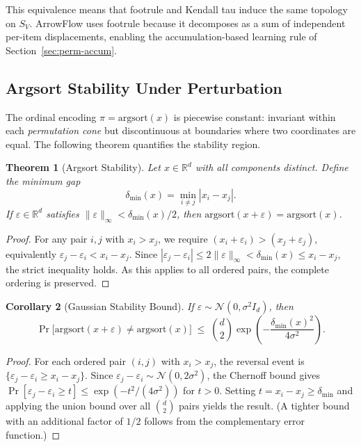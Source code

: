 \documentclass[12pt]{article}
\newcommand{\R}{\mathbb{R}}
\newcommand{\argsort}{\mathrm{argsort}}
\newtheorem{theorem}{Theorem}
\newtheorem{corollary}[theorem]{Corollary}
\begin{document}
This equivalence means that footrule and Kendall tau induce the same topology on $S_V$. ArrowFlow uses footrule because it decomposes as a sum of independent per-item displacements, enabling the accumulation-based learning rule of Section~\ref{sec:perm-accum}.

\subsection{Argsort Stability Under Perturbation}

The ordinal encoding $\pi = \argsort(x)$ is piecewise constant: invariant within each \emph{permutation cone} but discontinuous at boundaries where two coordinates are equal. The following theorem quantifies the stability region.

\begin{theorem}[Argsort Stability]
\label{thm:stability}
Let $x \in \R^d$ with all components distinct. Define the \emph{minimum gap}
\[
\delta_{\min}(x) = \min_{i \neq j} |x_i - x_j|.
\]
If $\varepsilon \in \R^d$ satisfies $\|\varepsilon\|_\infty < \delta_{\min}(x)/2$, then $\argsort(x + \varepsilon) = \argsort(x)$.
\end{theorem}

\begin{proof}
For any pair $i, j$ with $x_i > x_j$, we require $(x_i + \varepsilon_i) > (x_j + \varepsilon_j)$, equivalently $\varepsilon_j - \varepsilon_i < x_i - x_j$. Since $|\varepsilon_j - \varepsilon_i| \leq 2\|\varepsilon\|_\infty < \delta_{\min}(x) \leq x_i - x_j$, the strict inequality holds. As this applies to all ordered pairs, the complete ordering is preserved.
\end{proof}

\begin{corollary}[Gaussian Stability Bound]
\label{cor:gaussian}
If $\varepsilon \sim \mathcal{N}(0, \sigma^2 I_d)$, then
\[
\Pr\big[\argsort(x + \varepsilon) \neq \argsort(x)\big] \;\leq\; \binom{d}{2} \exp\!\left(-\frac{\delta_{\min}(x)^2}{4\sigma^2}\right).
\]
\end{corollary}

\begin{proof}
For each ordered pair $(i,j)$ with $x_i > x_j$, the reversal event is $\{\varepsilon_j - \varepsilon_i \geq x_i - x_j\}$. Since $\varepsilon_j - \varepsilon_i \sim \mathcal{N}(0, 2\sigma^2)$, the Chernoff bound gives $\Pr[\varepsilon_j - \varepsilon_i \geq t] \leq \exp(-t^2/(4\sigma^2))$ for $t > 0$. Setting $t = x_i - x_j \geq \delta_{\min}$ and applying the union bound over all $\binom{d}{2}$ pairs yields the result. (A tighter bound with an additional factor of $1/2$ follows from the complementary error function.)
\end{proof}
\end{document}
